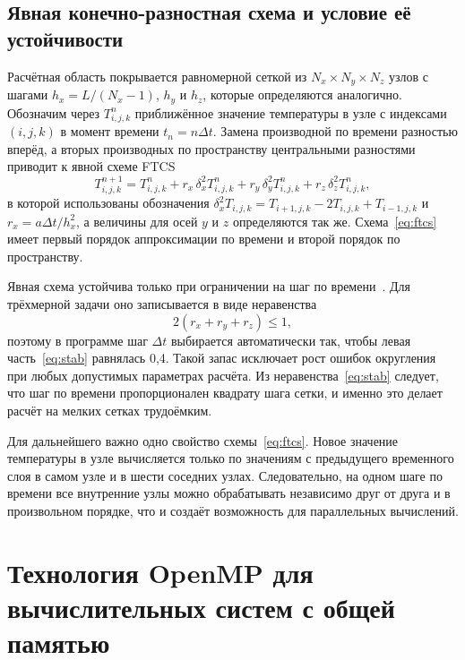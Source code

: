 \subsection{Явная конечно-разностная схема и условие её устойчивости}

Расчётная область покрывается равномерной сеткой из $N_x \times N_y \times N_z$ узлов с шагами $h_x = L / (N_x - 1)$, $h_y$ и $h_z$, которые определяются аналогично. Обозначим через $T^n_{i,j,k}$ приближённое значение температуры в узле с индексами $(i, j, k)$ в момент времени $t_n = n \Delta t$. Замена производной по времени разностью вперёд, а вторых производных по пространству центральными разностями приводит к явной схеме FTCS~\cite{kolgan1975finite}
\begin{equation}
    T^{n+1}_{i,j,k} = T^n_{i,j,k} + r_x \, \delta_x^2 T^n_{i,j,k} + r_y \, \delta_y^2 T^n_{i,j,k} + r_z \, \delta_z^2 T^n_{i,j,k},
    \label{eq:ftcs}
\end{equation}
в которой использованы обозначения $\delta_x^2 T_{i,j,k} = T_{i+1,j,k} - 2T_{i,j,k} + T_{i-1,j,k}$ и $r_x = a \Delta t / h_x^2$, а величины для осей $y$ и $z$ определяются так же. Схема~\eqref{eq:ftcs} имеет первый порядок аппроксимации по времени и второй порядок по пространству.

Явная схема устойчива только при ограничении на шаг по времени~\cite{dubey2015stability}. Для трёхмерной задачи оно записывается в виде неравенства
\begin{equation}
    2 \left( r_x + r_y + r_z \right) \le 1,
    \label{eq:stab}
\end{equation}
поэтому в программе шаг $\Delta t$ выбирается автоматически так, чтобы левая часть~\eqref{eq:stab} равнялась 0,4. Такой запас исключает рост ошибок округления при любых допустимых параметрах расчёта. Из неравенства~\eqref{eq:stab} следует, что шаг по времени пропорционален квадрату шага сетки, и именно это делает расчёт на мелких сетках трудоёмким.

Для дальнейшего важно одно свойство схемы~\eqref{eq:ftcs}. Новое значение температуры в узле вычисляется только по значениям с предыдущего временного слоя в самом узле и в шести соседних узлах. Следовательно, на одном шаге по времени все внутренние узлы можно обрабатывать независимо друг от друга и в произвольном порядке, что и создаёт возможность для параллельных вычислений.

\section{Технология OpenMP для вычислительных систем с общей памятью}

